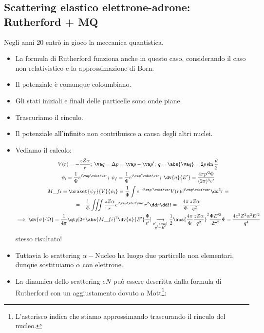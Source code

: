\subsection{Scattering elastico elettrone-adrone: Rutherford + MQ}
Negli anni 20 entrò in gioco la meccanica quantistica. 
\begin{itemize}
    \item La formula di Rutherford funziona anche in questo caso, considerando il caso non relativistico e la approssimazione di Born.
    \item Il potenziale è comunque coloumbiano.
    \item Gli stati iniziali e finali delle particelle sono onde piane.
    \item Trascuriamo il rinculo.
    \item Il potenziale all'infinito non contribuisce a causa degli altri nuclei.
    \item Vediamo il calcolo:
    \begin{gather*}
        V(r)=-\frac{zZ\alpha}r;\;\va q=\Delta p=\va p-\va p';\;q=\abs{\va q}=2p\sin\frac\vartheta2\\
        \psi_i=\frac1\Phi e^{i\va p\vdot \va r};\;\psi_f=\frac1\Phi e^{i\va p'\vdot \va r};\; \dv{n}{E'}=\frac{4\pi p'^2\Phi}{(2\pi)^3v'}\\
        M\_{fi}=\braket{\psi_f}{V}{\psi_i}=\frac1\Phi\int e^{-i\va p'\vdot\va r}V(r)e^{i\va p\vdot\va r}\dd^3r=\\
        =-\frac1\Phi\iiint \frac{zZ\alpha}re^{i\va q\vdot\va r}r^2\dd r\dd\Omega=-\frac{4\pi}\Phi\frac{zZ\alpha}{q^2}\\
        \implies \dv{\sigma}{\Omega}=\frac1{4\pi}\qty[2\pi\abs{M\_{fi}}^2\dv{n}{E'}\frac\Phi{v'}]\underset{\begin{subarray}{c}
            v'\to c=1\\
            p'=E'
         \end{subarray}}{\longrightarrow}\frac12\abs{\frac{4\pi}\Phi\frac{zZ\alpha}{q^2}}^2\frac{\Phi E'^2}{2\pi^2}\Phi=\frac{4z^2Z^2\alpha^2E'^2}{q^4}
    \end{gather*}
    stesso risultato!
    \item Tuttavia lo scattering $\alpha-$Nucleo ha luogo due particelle non elementari, dunque sostituiamo $\alpha$ con elettrone. 
    \item La dinamica dello scattering $eN$ può essere descritta dalla formula di Rutherford con un aggiustamento dovuto a Mott\footnote{L'asterisco indica che stiamo approssimando trascurando il rinculo del nucleo.}:

\end{itemize}
